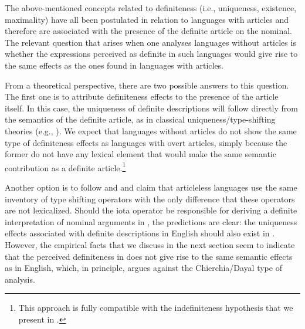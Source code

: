 \documentclass[output=paper]{langscibook}
\begin{document}

The above-mentioned concepts related to definiteness (i.e., uniqueness, existence, maximality) have all been postulated in relation to languages with articles and therefore are associated with the presence of the definite article on the nominal. The relevant question that arises when one analyses languages without articles is whether the expressions perceived as definite in such languages would give rise to the same effects as the ones found in languages with articles.

From a theoretical perspective, there are two possible answers to this question. The first one is to attribute definiteness effects to the presence of the article itself. In this case, the uniqueness of definite descriptions will follow directly from the semantics of the definite article, as in classical uniqueness/type-shifting theories (e.g., \citealt{Frege1892,Partee1987}). We expect that languages without articles do not show the same type of definiteness effects as languages with overt articles, simply because the former do not have any lexical element that would make the same semantic contribution as a definite article.\footnote{This approach is fully compatible with the indefiniteness hypothesis that we present in .}

Another option is to follow \citet{Chierchia1998} and \citet{Dayal2004} and claim that articleless languages use the same inventory of type shifting operators with the only difference that these operators are not lexicalized. Should the iota operator be responsible for deriving a definite interpretation of nominal arguments in , the predictions are clear: the uniqueness effects associated with definite descriptions in English should also exist in . However, the empirical facts that we discuss in the next section seem to indicate that the perceived definiteness in  does not give rise to the same semantic effects as in English, which, in principle, argues against the Chierchia/Dayal type of analysis.



\end{document}
